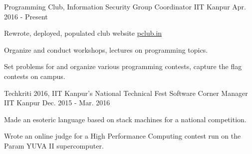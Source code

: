 


\begin{cventries}

  \cventry
  {Programming Club, Information Security Group}
  {Coordinator}
  {IIT Kanpur}
  {Apr. 2016 - Present}
  {
    \begin{cvitems}
    \item Rewrote, deployed, populated club website \href{http://pclub.in}{pclub.in}
    \item Organize and conduct workshops, lectures on programming topics.
    \item Set problems for and organize various programming contests,
      capture the flag contests on campus.
    \end{cvitems}
  }

  \cventry
  {Techkriti 2016, IIT Kanpur's National Technical Fest}
  {Software Corner Manager}
  {IIT Kanpur}
  {Dec. 2015 - Mar. 2016}
  {
    \begin{cvitems}
    \item Made an esoteric language based on stack machines for a
      national competition.
    \item Wrote an online judge for a High Performance Computing
      contest run on the Param YUVA II supercomputer.
    \end{cvitems}
  }

\end{cventries}

